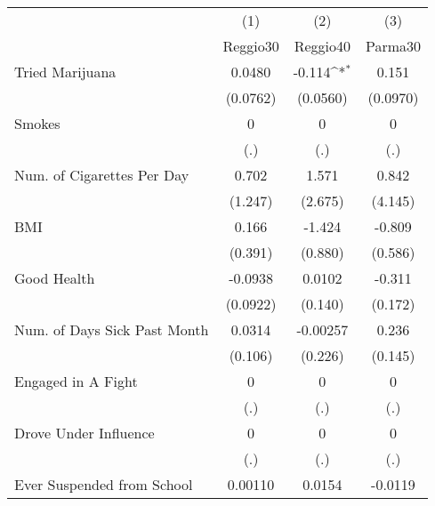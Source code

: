 {
\def\sym#1{\ifmmode^{#1}\else\(^{#1}\)\fi}
\begin{tabular}{l*{3}{c}}
\toprule
            &\multicolumn{1}{c}{(1)}&\multicolumn{1}{c}{(2)}&\multicolumn{1}{c}{(3)}\\
            &\multicolumn{1}{c}{Reggio30}&\multicolumn{1}{c}{Reggio40}&\multicolumn{1}{c}{Parma30}\\
\midrule
Tried Marijuana&      0.0480         &      -0.114\sym{*}  &       0.151         \\
            &    (0.0762)         &    (0.0560)         &    (0.0970)         \\
\addlinespace
Smokes      &           0         &           0         &           0         \\
            &         (.)         &         (.)         &         (.)         \\
\addlinespace
Num. of Cigarettes Per Day&       0.702         &       1.571         &       0.842         \\
            &     (1.247)         &     (2.675)         &     (4.145)         \\
\addlinespace
BMI         &       0.166         &      -1.424         &      -0.809         \\
            &     (0.391)         &     (0.880)         &     (0.586)         \\
\addlinespace
Good Health &     -0.0938         &      0.0102         &      -0.311         \\
            &    (0.0922)         &     (0.140)         &     (0.172)         \\
\addlinespace
Num. of Days Sick Past Month&      0.0314         &    -0.00257         &       0.236         \\
            &     (0.106)         &     (0.226)         &     (0.145)         \\
\addlinespace
Engaged in A Fight&           0         &           0         &           0         \\
            &         (.)         &         (.)         &         (.)         \\
\addlinespace
Drove Under Influence&           0         &           0         &           0         \\
            &         (.)         &         (.)         &         (.)         \\
\addlinespace
Ever Suspended from School&     0.00110         &      0.0154         &     -0.0119         \\

\end{tabular}}
